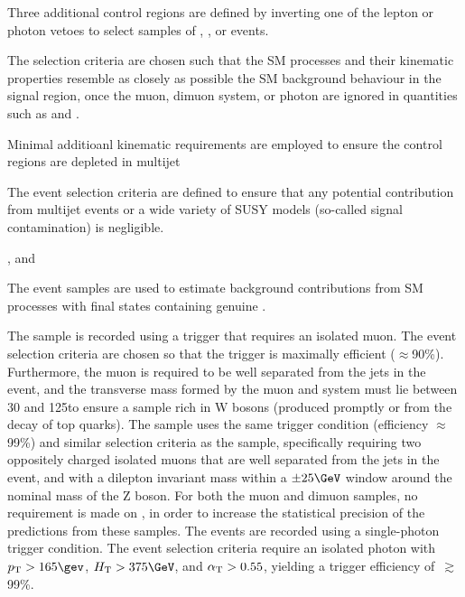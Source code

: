 Three additional control regions are defined by inverting one of the
lepton or photon vetoes to select samples of \mj, \mmj, or \gj
events. 

The selection criteria are chosen such that the SM processes and their
kinematic properties resemble as closely as possible the SM background
behaviour in the signal region, once the muon, dimuon system, or
photon are ignored in quantities such as \scalht and \alphat. 

Minimal additioanl kinematic requirements are employed to ensure the
control regions are depleted in multijet 

The event selection criteria are defined to ensure that any potential
contribution from multijet events or a wide variety of SUSY models
(\ie so-called signal contamination) is negligible.

, and 

The
event samples are used to estimate background contributions from SM
processes with final states containing genuine \ptvecmiss.  



The \mj sample is recorded using a trigger that requires an isolated
muon. The event selection criteria are chosen so that the trigger is
maximally efficient ($\approx$90\%). Furthermore, the muon is required
to be well separated from the jets in the event, and the transverse
mass formed by the muon and \ETmiss system must lie between 30 and
125\GeV to ensure a sample rich in W bosons (produced promptly or from
the decay of top quarks). The \mmj sample uses the same trigger
condition (efficiency $\approx$99\%) and similar selection criteria as
the \mj sample, specifically requiring two oppositely charged isolated
muons that are well separated from the jets in the event, and with a
dilepton invariant mass within a $\pm 25\GeV$ window around the
nominal mass of the Z boson. For both the muon and dimuon samples, no
requirement is made on \alphat, in order to increase the statistical
precision of the predictions from these samples.  The \gj events are
recorded using a single-photon trigger condition. The event selection
criteria require an isolated photon with $\Pt > 165\gev$, $\scalht >
375\GeV$, and $\alpha_{\text{T}} > 0.55$, yielding a trigger efficiency
of~$\gtrsim$99\%.
